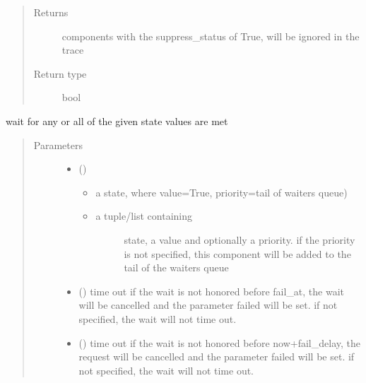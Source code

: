 \documentclass[letterpaper,10pt,english]{sphinxmanual}
\begin{document}
\begin{fulllineitems}
\begin{fulllineitems}
\begin{quote}
\begin{description}
\item[{Returns}] \leavevmode
{} \textendash{} components with the suppress\_status of True, will be ignored in the trace

\item[{Return type}] \leavevmode
bool

\end{description}\end{quote}

\end{fulllineitems}


\begin{fulllineitems}
\label{\detokenize{Reference:salabim.Component.wait}}
wait for any or all of the given state values are met
\begin{quote}\begin{description}
\item[{Parameters}] \leavevmode\begin{itemize}
\item {} 
 (\sphinxstyleliteralemphasis{, }) \textendash{} \begin{itemize}
\item {} 
a state, where value=True, priority=tail of waiters queue)

\item {} \begin{description}
\item[{a tuple/list containing }] \leavevmode
state, a value and optionally a priority. 
if the priority is not specified, this component will
be added to the tail of
the waiters queue 

\end{description}

\end{itemize}


\item {} 
 () \textendash{} time out 
if the wait is not honored before fail\_at,
the wait will be cancelled and the
parameter failed will be set. 
if not specified, the wait will not time out.

\item {} 
 () \textendash{} time out 
if the wait is not honored before now+fail\_delay,
the request will be cancelled and the
parameter failed will be set. 
if not specified, the wait will not time out.


\end{itemize}
\end{description}
\end{quote}
\end{fulllineitems}
\end{fulllineitems}
\end{document}
